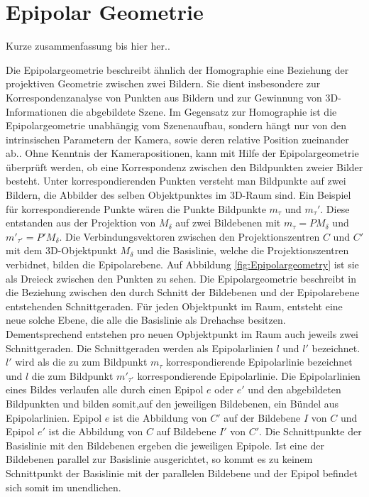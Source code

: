\chapter{Epipolar Geometrie}
\label{sec:epipolar} 

Kurze zusammenfassung bis hier her..

Die Epipolargeometrie beschreibt ähnlich der Homographie eine Beziehung der projektiven Geometrie zwischen zwei Bildern\cite{HZ}. Sie dient insbesondere zur Korrespondenzanalyse von Punkten aus Bildern und zur Gewinnung von 3D-Informationen die abgebildete Szene. Im Gegensatz zur Homographie ist die Epipolargeometrie unabhängig vom Szenenaufbau, sondern hängt nur von den intrinsischen Parametern der Kamera, sowie deren relative Position zueinander ab.\cite{HZ}. Ohne Kenntnis der Kamerapositionen, kann mit Hilfe der Epipolargeometrie überprüft werden, ob eine Korrespondenz zwischen den Bildpunkten zweier Bilder besteht. Unter korrespondierenden Punkten versteht man Bildpunkte auf zwei Bildern, die Abbilder des selben Objektpunktes im 3D-Raum sind. Ein Beispiel für korrespondierende Punkte wären die Punkte Bildpunkte $m_\tau$ und $m_\tau'$. Diese entstanden aus der Projektion von $M_\delta$ auf zwei Bildebenen mit $m_\tau = PM_\delta$ und $m'_{\tau'} = P'M_\delta$. Die Verbindungsvektoren zwischen den Projektionszentren $C$ und $C'$ mit dem 3D-Objektpunkt $M_\delta$ und die Basislinie, welche die Projektionszentren verbidnet, bilden die Epipolarebene. Auf Abbildung \ref{fig:Epipolargeometry} ist sie als Dreieck zwischen den Punkten zu sehen. Die Epipolargeometrie beschreibt in die Beziehung zwischen den durch Schnitt der Bildebenen und der Epipolarebene entstehenden Schnittgeraden. Für jeden Objektpunkt im Raum, entsteht eine neue solche Ebene, die alle die Basislinie als Drehachse besitzen\cite{HZ}. Dementsprechend entstehen pro neuen Opbjektpunkt im Raum auch jeweils zwei Schnittgeraden. Die Schnittgeraden werden als Epipolarlinien $l$ und $l'$ bezeichnet. $l'$ wird als die zu zum Bildpunkt $m_\tau$ korrespondierende Epipolarlinie bezeichnet und $l$ die zum Bildpunkt $m'_{\tau'}$ korrespondierende Epipolarlinie.  Die Epipolarlinien eines Bildes verlaufen alle durch einen Epipol $e$ oder $e'$ und den abgebildeten Bildpunkten und bilden somit,auf den jeweiligen Bildebenen, ein Bündel aus Epipolarlinien. Epipol $e$ ist die Abbildung von $C'$ auf der Bildebene $I$ von $C$ und Epipol $e'$ ist die Abbildung von $C$ auf Bildebene $I'$ von $C'$. Die Schnittpunkte der Basislinie mit den Bildebenen ergeben die jeweiligen Epipole. Ist eine der Bildebenen parallel zur Basislinie ausgerichtet, so kommt es zu keinem Schnittpunkt der Basislinie mit der parallelen Bildebene und der Epipol befindet sich somit im unendlichen\cite{HZ,ZZGXr}.

